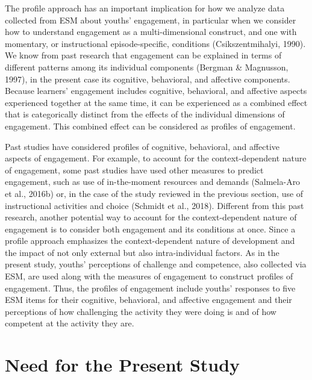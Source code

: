 \documentclass[]{msu-thesis}
\theoremstyle{definition}
\theoremstyle{definition}
\theoremstyle{definition}
\theoremstyle{remark}
\begin{document}
The profile approach has an important implication for how we analyze
data collected from ESM about youths' engagement, in particular when we
consider how to understand engagement as a multi-dimensional construct,
and one with momentary, or instructional episode-specific, conditions
(Csikszentmihalyi, 1990). We know from past research that engagement can
be explained in terms of different patterns among its individual
components (Bergman \& Magnusson, 1997), in the present case its
cognitive, behavioral, and affective components. Because learners'
engagement includes cognitive, behavioral, and affective aspects
experienced together at the same time, it can be experienced as a
combined effect that is categorically distinct from the effects of the
individual dimensions of engagement. This combined effect can be
considered as profiles of engagement.

Past studies have considered profiles of cognitive, behavioral, and
affective aspects of engagement. For example, to account for the
context-dependent nature of engagement, some past studies have used
other measures to predict engagement, such as use of in-the-moment
resources and demands (Salmela-Aro et al., 2016b) or, in the case of the
study reviewed in the previous section, use of instructional activities
and choice (Schmidt et al., 2018). Different from this past research,
another potential way to account for the context-dependent nature of
engagement is to consider both engagement and its conditions at once.
Since a profile approach emphasizes the context-dependent nature of
development and the impact of not only external but also
intra-individual factors. As in the present study, youths' perceptions
of challenge and competence, also collected via ESM, are used along with
the measures of engagement to construct profiles of engagement. Thus,
the profiles of engagement include youths' responses to five ESM items
for their cognitive, behavioral, and affective engagement and their
perceptions of how challenging the activity they were doing is and of
how competent at the activity they are.

\section{Need for the Present Study}\label{need-for-the-present-study}
\end{document}
